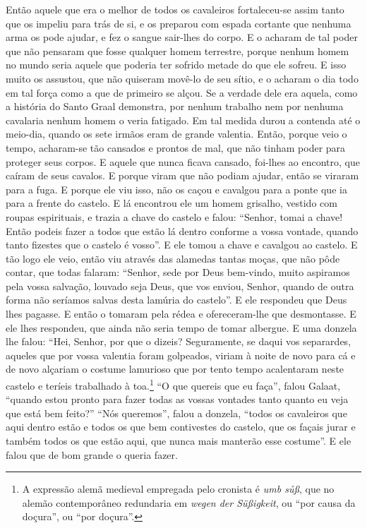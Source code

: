 Então aquele que era o melhor de todos os cavaleiros fortaleceu-se assim tanto
que os impeliu para trás de si, e os preparou com espada cortante que nenhuma
arma os pode ajudar, e fez o sangue sair-lhes do corpo. E o acharam de tal
poder que não pensaram que fosse qualquer homem terrestre, porque nenhum homem no
mundo seria aquele que poderia ter sofrido metade do que ele sofreu. E isso
muito os assustou, que não quiseram movê-lo de seu sítio, e o acharam o dia
todo em tal força como a que de primeiro se alçou. Se a verdade dele era
aquela, como a história do Santo Graal demonstra, por nenhum trabalho nem
por nenhuma cavalaria nenhum homem o veria fatigado. Em tal medida durou a
contenda até o meio-dia, quando os sete irmãos eram de grande valentia. Então,
porque veio o tempo, acharam-se tão cansados e prontos de mal, que não tinham
poder para proteger seus corpos. E aquele que nunca ficava cansado, foi-lhes ao
encontro, que caíram de seus cavalos. E porque viram que não podiam ajudar,
então se viraram para a fuga. E porque ele viu isso, não os caçou e cavalgou
para a ponte que ia para a frente do castelo. E lá encontrou ele um homem
grisalho, vestido com roupas espirituais, e trazia a chave do castelo e falou:
“Senhor, tomai a chave! Então podeis fazer a todos que estão lá dentro conforme
a vossa vontade, quando tanto fizestes que o castelo é vosso”. E ele tomou a
chave e cavalgou ao castelo. E tão logo ele veio, então viu através das
alamedas tantas moças, que não pôde contar, que todas falaram: “Senhor, sede
por Deus bem-vindo, muito aspiramos pela vossa salvação, louvado seja Deus, que
vos enviou, Senhor, quando de outra forma não seríamos salvas desta lamúria do
castelo”. E ele respondeu que Deus lhes pagasse. E então o tomaram pela rédea e
ofereceram-lhe que desmontasse. E ele lhes respondeu, que ainda não seria tempo
de tomar albergue. E uma donzela lhe falou: “Hei, Senhor, por que o dizeis?
Seguramente, se daqui vos separardes, aqueles que por vossa valentia foram
golpeados, viriam à noite de novo para cá e de novo alçariam o costume
lamurioso que por tento tempo acalentaram neste castelo e teríeis trabalhado à
toa.\footnote{ A expressão alemã medieval empregada pelo cronista é \textit{umb
sůß}, que no alemão contemporâneo redundaria em \textit{wegen der Süßigkeit},
ou “por causa da doçura”, ou “por doçura”.} “O que quereis que eu
faça”, falou Galaat, “quando estou pronto para fazer todas as vossas vontades
tanto quanto eu veja que está bem feito?” “Nós queremos”, falou a donzela,
“todos os cavaleiros que aqui dentro estão e todos os que bem contivestes do
castelo, que os façais jurar e também todos os que estão aqui, que nunca mais
manterão esse costume”. E ele falou que de bom grande o queria fazer. 

